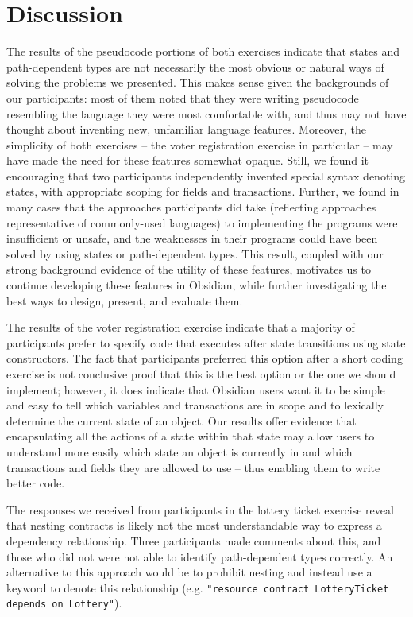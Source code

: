 \documentclass[sigplan,10pt,review]{acmart}\settopmatter{printfolios=true}
\begin{document}
\section{Discussion}

The results of the pseudocode portions of both exercises indicate that states and path-dependent types are not necessarily the most obvious or 
natural ways of solving the problems we presented. This makes sense given the backgrounds of our participants: most of them noted that they 
were writing pseudocode resembling the language they were most comfortable with, and thus may not have thought about inventing new, 
unfamiliar language features. Moreover, the simplicity of both exercises -- the voter registration exercise in particular -- may have made the 
need for these features somewhat opaque. Still, we found it encouraging that two participants independently invented special syntax denoting states, with appropriate scoping for fields and transactions. Further, we found in many cases that the approaches participants did take (reflecting approaches representative of commonly-used languages) to implementing the 
programs were insufficient or unsafe, and the weaknesses in their programs could have been solved by using states or path-dependent 
types. This result, coupled with our strong background evidence of the utility of these features, motivates us to continue developing these
features in Obsidian, while further investigating the best ways to design, present, and evaluate them. 

The results of the voter registration exercise indicate that a majority of participants prefer to specify code that executes after state transitions using state constructors. The 
fact that participants preferred this option after a short coding exercise is not conclusive proof that this is the best option or the one we should 
implement; however, it does indicate that Obsidian users want it to be simple and easy to tell which variables and transactions are in scope and to lexically determine the 
current state of an object. Our results offer evidence that encapsulating all the actions of a state within that state may allow users to understand 
more easily which state an object is currently in and which transactions and fields they are allowed to use -- thus enabling them to write better code. 

The responses we received from participants in the lottery ticket exercise reveal that nesting contracts is likely not the most understandable
way to express a dependency relationship. Three participants made comments about this, and those who did not were not 
able to identify path-dependent types correctly. An alternative to this approach would be to prohibit nesting and instead use a keyword
to denote this relationship (e.g. \texttt{\small{"resource contract LotteryTicket depends on Lottery"}}).
\end{document}
